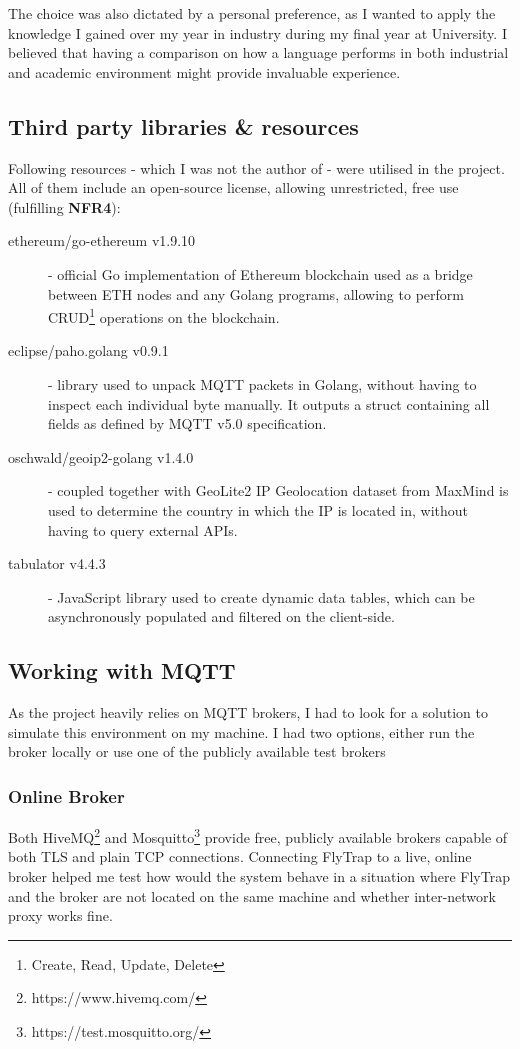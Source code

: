 The choice was also dictated by a personal preference, as I wanted to apply the knowledge I gained over my year in industry during my final year at University. I believed that having a comparison on how a language performs in both industrial and academic environment might provide invaluable experience.
\subsection{Third party libraries \& resources}\label{sec:tpp}
Following resources - which I was not the author of - were utilised in the project. All of them include an open-source license, allowing unrestricted, free use (fulfilling \textbf{NFR4}):
\begin{description}
  \item[ethereum/go-ethereum v1.9.10] \cite{ethereum2017official} - official Go implementation of Ethereum blockchain used as a bridge between ETH nodes and any Golang programs, allowing to perform CRUD\footnote{Create, Read, Update, Delete} operations on the blockchain.
    \item[eclipse/paho.golang v0.9.1] \cite{pahogolang} - library used to unpack MQTT packets in Golang, without having to inspect each individual byte manually. It outputs a struct containing all fields as defined by MQTT v5.0 specification.
    \item[oschwald/geoip2-golang v1.4.0] \cite{geoip2} - coupled together with GeoLite2 IP Geolocation dataset from MaxMind \cite{maxmind} is used to determine the country in which the IP is located in, without having to query external APIs. 
    \item[tabulator v4.4.3] \cite{tabulator} - JavaScript library used to create dynamic data tables, which can be asynchronously populated and filtered on the client-side.
\end{description}

\subsection{Working with MQTT}
As the project heavily relies on MQTT brokers, I had to look for a solution to simulate this environment on my machine. I had two  options, either run the broker locally or use one of the publicly available test brokers
\subsubsection{Online Broker}
Both HiveMQ\footnote{https://www.hivemq.com/} and Mosquitto\footnote{https://test.mosquitto.org/} provide free, publicly available brokers capable of both TLS and plain TCP connections. Connecting FlyTrap to a live, online broker helped me test how would the system behave in a situation where FlyTrap and the broker are not located on the same machine and whether inter-network proxy works fine.
